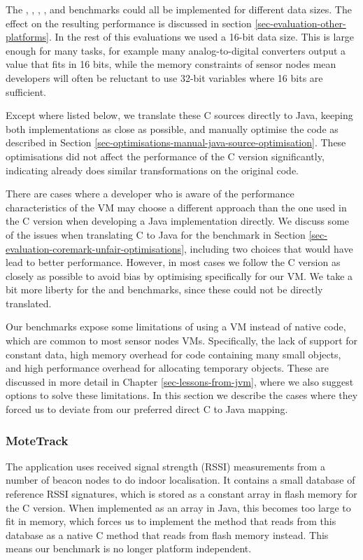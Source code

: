 The , , , , and  benchmarks could all be implemented for different data sizes. The effect on the resulting performance is discussed in section \ref{sec-evaluation-other-platforms}. In the rest of this evaluations we used a 16-bit data size. This is large enough for many tasks, for example many analog-to-digital converters output a value that fits in 16 bits, while the memory constraints of sensor nodes mean developers will often be reluctant to use 32-bit variables where 16 bits are sufficient.

Except where listed below, we translate these C sources directly to Java, keeping both implementations as close as possible, and manually optimise the code as described in Section \ref{sec-optimisations-manual-java-source-optimisation}. These optimisations did not affect the performance of the C version significantly, indicating  already does similar transformations on the original code.

There are cases where a developer who is aware of the performance characteristics of the VM may choose a different approach than the one used in the C version when developing a Java implementation directly. We discuss some of the issues when translating C to Java for the  benchmark in Section \ref{sec-evaluation-coremark-unfair-optimisations}, including two choices that would have lead to better performance. However, in most cases we follow the C version as closely as possible to avoid bias by optimising specifically for our VM. We take a bit more liberty for the  and  benchmarks, since these could not be directly translated.

Our benchmarks expose some limitations of using a VM instead of native code, which are common to most sensor nodes VMs. Specifically, the lack of support for constant data, high memory overhead for code containing many small objects, and high performance overhead for allocating temporary objects. These are discussed in more detail in Chapter \ref{sec-lessons-from-jvm}, where we also suggest options to solve these limitations. In this section we describe the cases where they forced us to deviate from our preferred direct C to Java mapping.


\subsubsection{MoteTrack}
\label{sec-evaluation-benchmark-implementation-motetrack}
The  application uses received signal strength (RSSI) measurements from a number of beacon nodes to do indoor localisation. It contains a small database of reference RSSI signatures, which is stored as a constant array in flash memory for the C version. When implemented as an array in Java, this becomes too large to fit in memory, which forces us to implement the method that reads from this database as a native C method that reads from flash memory instead. This means our benchmark is no longer platform independent.

